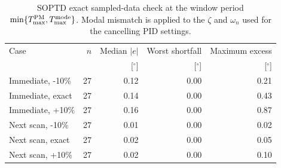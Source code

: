 \begin{table}[pos=!htb]
\centering
\caption{SOPTD exact sampled-data check at the window period
$\min\{T_{\max}^{\rm PM},T_{\max}^{\rm mode}\}$. Modal mismatch is applied to
the $\zeta$ and $\omega_n$ used for the cancelling PID settings.}
\label{tab:soptd-validation}
\small
\setlength{\tabcolsep}{3.8pt}
\begin{tabular}{@{}lrrrr@{}}
\toprule
Case & $n$ & Median $|e|$ & Worst shortfall & Maximum excess\\
 & & [$^\circ$] & [$^\circ$] & [$^\circ$]\\
\midrule
Immediate, -10\% & 27 & 0.12 & 0.00 & 0.21\\
Immediate, exact & 27 & 0.14 & 0.00 & 0.43\\
Immediate, +10\% & 27 & 0.16 & 0.00 & 0.87\\
Next scan, -10\% & 27 & 0.01 & 0.00 & 0.02\\
Next scan, exact & 27 & 0.02 & 0.00 & 0.05\\
Next scan, +10\% & 27 & 0.02 & 0.00 & 0.10\\
\bottomrule
\end{tabular}
\end{table}
